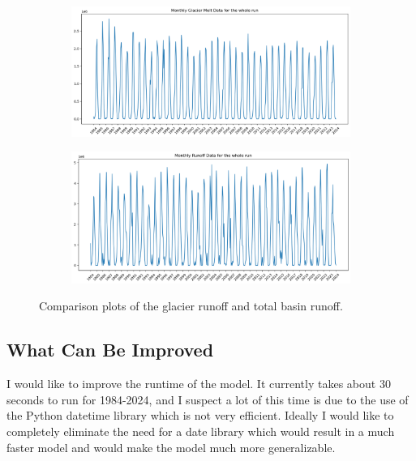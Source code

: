 \documentclass{article}
\begin{document}
\begin{figure}[h]
    \centering
    \begin{subfigure}[b]{\textwidth}
        \centering
        \includegraphics[width=\textwidth]{Plots/glacier_runoff.png}
        \label{fig:glacier_runoff}
    \end{subfigure}
    \hfill
    \begin{subfigure}[b]{\textwidth}
        \centering
        \includegraphics[width=\textwidth]{Plots/all_runoff.png}
        \label{fig:all_runoff}
    \end{subfigure}
    \caption{Comparison plots of the glacier runoff and total basin runoff.}
    \label{fig:runoff_compare}
\end{figure}
\FloatBarrier

\subsection{What Can Be Improved}
I would like to improve the runtime of the model. It currently takes about 30 seconds to run for 1984-2024, and I suspect a lot of this time 
is due to the use of the Python datetime library which is not very efficient. Ideally I would like to completely eliminate the need for a date 
library which would result in a much faster model and would make the model much more generalizable.
\end{document}
